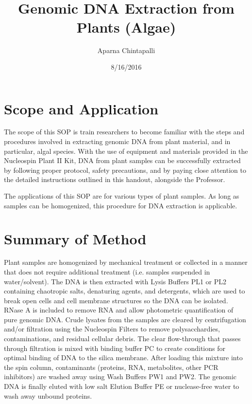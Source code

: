 \documentclass[12pt]{../SOP3_alpha}\usepackage[]{graphicx}\usepackage[]{color}
\title{Genomic DNA Extraction from Plants (Algae)}
\date{8/16/2016}
\author{Aparna Chintapalli}
\begin{document}

\maketitle

\section{Scope and Application}

\NP The scope of this SOP is train researchers to become familiar with the steps and procedures involved in extracting genomic DNA from plant material, and in particular, algal species. With the use of equipment and materials provided in the Nucleospin Plant II Kit, DNA from plant samples can be successfully extracted by following proper protocol, safety precautions, and by paying close attention to the detailed instructions outlined in this handout, alongside the Professor. 

\NP The applications of this SOP are for various types of plant samples. As long as samples can be homogenized, this procedure for DNA extraction is applicable. 

\section{Summary of Method}

\NP Plant samples are homogenized by mechanical treatment or collected in a manner that does not require additional treatment (i.e. samples suspended in water/solvent). The DNA is then extracted with Lysis Buffers PL1 or PL2 containing chaotropic salts, denaturing agents, and detergents, which are used to break open cells and cell membrane structures so the DNA can be isolated. RNase A is included to remove RNA and allow photometric quantification of pure genomic DNA. Crude lysates from the samples are cleared by centrifugation and/or filtration using the Nucleospin Filters to remove polysacchardies, contaminations, and residual cellular debris. The clear flow-through that passes through filtration is mixed with binding buffer PC to create conditions for optimal binding of DNA to the silica membrane. After loading this mixture into the spin column, contaminants (proteins, RNA, metabolites, other PCR inhibitors) are washed away using Wash Buffers PW1 and PW2. The genomic DNA is finally eluted with low salt Elution Buffer PE or nuclease-free water to wash away unbound proteins.
\end{document}
